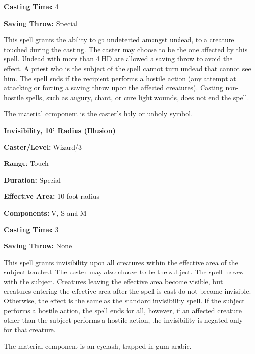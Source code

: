 \begin{multicols}{2}
\begin{minipage}{\columnwidth}
\noindent \textbf{Casting Time:} 4

\noindent \textbf{Saving Throw:} Special

\end{minipage}

This spell grants the ability to go undetected amongst undead, to a creature touched during the casting.  The caster may choose to be the one affected by this spell.  Undead with more than 4 HD are allowed a saving throw to avoid the effect.  A priest who is the subject of the spell cannot turn undead that cannot see him.  The spell ends if the recipient performs a hostile action (any attempt at attacking or forcing a saving throw upon the affected creatures).  Casting non-hostile spells, such as augury, chant, or cure light wounds, does not end the spell.

The material component is the caster's holy or unholy symbol.

\vspace{1em}

\noindent
\begin{minipage}{\columnwidth}

\noindent \textbf{Invisibility, 10' Radius (Illusion)}

\noindent \textbf{Caster/Level:} Wizard/3

\noindent \textbf{Range:} Touch

\noindent \textbf{Duration:} Special

\noindent \textbf{Effective Area:} 10-foot radius

\noindent \textbf{Components:} V, S and M

\noindent \textbf{Casting Time:} 3

\noindent \textbf{Saving Throw:} None

\end{minipage}

This spell grants invisibility upon all creatures within the effective area of the subject touched.  The caster may also choose to be the subject.  The spell moves with the subject.  Creatures leaving the effective area become visible, but creatures entering the effective area after the spell is cast do not become invisible.  Otherwise, the effect is the same as the standard invisibility spell.  If the subject performs a hostile action, the spell ends for all, however, if an affected creature other than the subject performs a hostile action, the invisibility is negated only for that creature.  

The material component is an eyelash, trapped in gum arabic.


\end{multicols}
